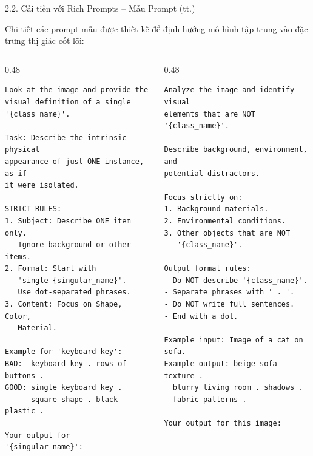 \documentclass[11pt]{beamer}
\begin{document}
\begin{frame}[fragile, shrink=5]{2.2. Cải tiến với Rich Prompts -- Mẫu Prompt (tt.)}
\scriptsize

Chi tiết các prompt mẫu được thiết kế để định hướng mô hình tập trung vào
đặc trưng thị giác cốt lõi:

\begin{columns}[T,onlytextwidth]
\begin{column}{0.48\textwidth}
\begin{lstlisting}[style=bashstyle,caption={Positive Prompt},label=lst:pos_prompt]
Look at the image and provide the
visual definition of a single
'{class_name}'.

Task: Describe the intrinsic physical
appearance of just ONE instance, as if
it were isolated.

STRICT RULES:
1. Subject: Describe ONE item only.
   Ignore background or other items.
2. Format: Start with
   'single {singular_name}'.
   Use dot-separated phrases.
3. Content: Focus on Shape, Color,
   Material.

Example for 'keyboard key':
BAD:  keyboard key . rows of buttons .
GOOD: single keyboard key .
      square shape . black plastic .

Your output for '{singular_name}':
\end{lstlisting}
\end{column}

\begin{column}{0.48\textwidth}
\begin{lstlisting}[style=bashstyle,caption={Negative Prompt},label=lst:neg_prompt]
Analyze the image and identify visual
elements that are NOT '{class_name}'.

Describe background, environment, and
potential distractors.

Focus strictly on:
1. Background materials.
2. Environmental conditions.
3. Other objects that are NOT
   '{class_name}'.

Output format rules:
- Do NOT describe '{class_name}'.
- Separate phrases with ' . '.
- Do NOT write full sentences.
- End with a dot.

Example input: Image of a cat on sofa.
Example output: beige sofa texture .
  blurry living room . shadows .
  fabric patterns .

Your output for this image:
\end{lstlisting}
\end{column}
\end{columns}

\end{frame}
\end{document}
